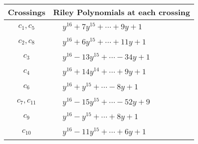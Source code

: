 \documentclass[1p]{elsarticle_modified}
\theoremstyle{definition}
\begin{document}
\begin{tabular}{m{50pt}|m{274pt}}
Crossings & \hspace{64pt}Riley Polynomials at each crossing \\
\hline $$\begin{aligned}c_{1},c_{5}\end{aligned}$$&$\begin{aligned}
&y^{16}+7 y^{15}+\cdots+9 y+1
\end{aligned}$\\
\hline $$\begin{aligned}c_{2},c_{8}\end{aligned}$$&$\begin{aligned}
&y^{16}+6 y^{15}+\cdots+11 y+1
\end{aligned}$\\
\hline $$\begin{aligned}c_{3}\end{aligned}$$&$\begin{aligned}
&y^{16}-13 y^{15}+\cdots-34 y+1
\end{aligned}$\\
\hline $$\begin{aligned}c_{4}\end{aligned}$$&$\begin{aligned}
&y^{16}+14 y^{14}+\cdots+9 y+1
\end{aligned}$\\
\hline $$\begin{aligned}c_{6}\end{aligned}$$&$\begin{aligned}
&y^{16}+y^{15}+\cdots-8 y+1
\end{aligned}$\\
\hline $$\begin{aligned}c_{7},c_{11}\end{aligned}$$&$\begin{aligned}
&y^{16}-15 y^{15}+\cdots-52 y+9
\end{aligned}$\\
\hline $$\begin{aligned}c_{9}\end{aligned}$$&$\begin{aligned}
&y^{16}- y^{15}+\cdots+8 y+1
\end{aligned}$\\
\hline $$\begin{aligned}c_{10}\end{aligned}$$&$\begin{aligned}
&y^{16}-11 y^{15}+\cdots+6 y+1
\end{aligned}$\\
\hline
\end{tabular}\\~\\
\end{document}

